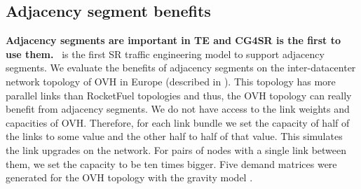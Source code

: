 

\subsection{Adjacency segment benefits}

\textbf{Adjacency segments are important in TE and CG4SR is the first to use them.}
\name~is the first SR traffic engineering model to support adjacency segments.
We evaluate the benefits of adjacency segments on the inter-datacenter network topology of OVH
in Europe (described in \cite{scmon}).
This topology has more parallel links than RocketFuel topologies and
thus, the OVH topology can really benefit from adjacency segments.
We do not have access to the link weights and capacities of OVH.
Therefore, for each link bundle we set the capacity of half of the links to some value and the other
half to half of that value. This simulates the link upgrades on the network. For pairs of
nodes with a single link between them, we set the capacity to be ten times bigger.
Five demand matrices were generated for the OVH topology with the gravity model \cite{gravitymodel}.

